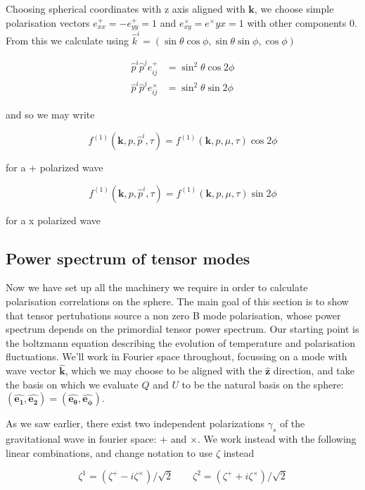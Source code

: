 \documentclass[a4paper,11pt]{article}
\renewcommand{\v}[1]{\mathbf{#1}}
\newcommand{\unit}[1]{\hat{\v{#1}}}
\begin{document}
Choosing spherical coordinates with z axis aligned with $\v{k}$, we choose simple polarisation vectors $e^+_{xx}=-e^+_{yy}=1$ and $e^\times_{xy}=e^\times{yx}=1$ with other components 0. From this we calculate using $\hat{k}^i = (\sin\theta\cos\phi, \sin\theta\sin\phi, \cos\phi)$

\begin{align}
\hat{p}^i\hat{p}^je_{ij}^+ &= \sin^2{\theta}\cos{2\phi} \\
\hat{p}^i\hat{p}^je_{ij}^\times &= \sin^2{\theta}\sin{2\phi}
\end{align}

and so we may write 

\begin{equation}
f^{(1)}(\v{k}, p, \hat{p}^i, \tau) = f^{(1)}(\v{k}, p, \mu, \tau)\cos{2\phi}
\end{equation}

for a + polarized wave


\begin{equation}
f^{(1)}(\v{k}, p, \hat{p}^i, \tau) = f^{(1)}(\v{k}, p, \mu, \tau)\sin{2\phi}
\end{equation}

for a x polarized wave


\subsection{Power spectrum of tensor modes}

Now we have set up all the machinery we require in order to calculate polarisation correlations on the sphere. The main goal of this section is to show that tensor pertubations source a non zero B mode polarisation, whose power spectrum depends on the primordial tensor power spectrum. Our starting point is the boltzmann equation describing the evolution of temperature and polarisation fluctuations.  We'll work in Fourier space throughout, focussing on a mode with wave vector $\unit{k}$, which we may choose to be aligned with the $\unit{z}$ direction, and take the basis on which we evaluate $Q$ and $U$ to be the natural basis on the sphere: $(\unit{e_1}, \unit{e_2}) = (\unit{e_\theta}, \unit{e_\phi})$.

As we saw earlier, there exist two independent polarizations $\gamma_s$ of the gravitational wave in fourier space: $+$ and $\times$. We work instead with the following linear combinations, and change notation to use $\zeta$ instead

\begin{equation}
\zeta^1 = (\zeta^+ - i\zeta^\times)/\sqrt{2} \qquad \zeta^2 = (\zeta^+ + i\zeta^\times)/\sqrt{2}
\end{equation}
\end{document}
